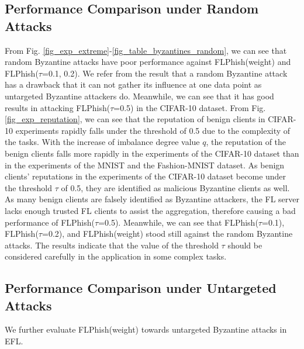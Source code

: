 \documentclass[lettersize,journal]{IEEEtran}
\begin{document}
  \subsection{Performance Comparison under Random Attacks}
  From Fig. \ref{fig_exp_extreme}-\ref{fig_table_byzantines_random}, we can see that random Byzantine attacks have poor performance against FLPhish(weight) and FLPhish($\tau$=0.1, 0.2). We refer from the result that a random Byzantine attack has a drawback that it can not gather its influence at one data point as untargeted Byzantine attackers do. Meanwhile, we can see that it has good results in attacking FLPhish($\tau$=0.5) in the CIFAR-10 dataset. From Fig. \ref{fig_exp_reputation}, we can see that the reputation of benign clients in CIFAR-10 experiments rapidly falls under the threshold of 0.5 due to the complexity of the tasks. With the increase of imbalance degree value $q$, the reputation of the benign clients falls more rapidly in the experiments of the CIFAR-10 dataset than in the experiments of the MNIST and the Fashion-MNIST dataset. As benign clients' reputations in the experiments of the CIFAR-10 dataset become under the threshold $\tau$ of 0.5, they are identified as malicious Byzantine clients as well. As many benign clients are falsely identified as Byzantine attackers, the FL server lacks enough trusted FL clients to assist the aggregation, therefore causing a bad performance of FLPhish($\tau$=0.5). Meanwhile, we can see that FLPhish($\tau$=0.1), FLPhish($\tau$=0.2), and FLPhish(weight) stood still against the random Byzantine attacks. The results indicate that the value of the threshold $\tau$ should be considered carefully in the application in some complex tasks.








  \subsection{{Performance Comparison under Untargeted Attacks}} We further evaluate FLPhish(weight) towards untargeted Byzantine attacks in EFL.
  

  
\end{document}
